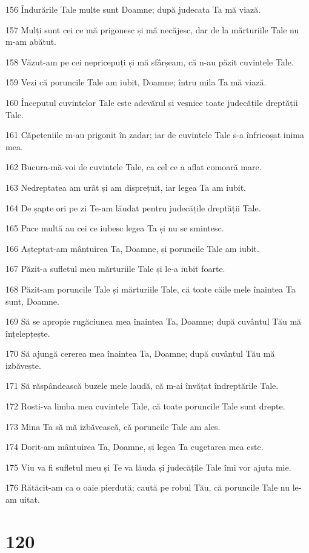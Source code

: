 \par 156 Îndurările Tale multe sunt Doamne; după judecata Ta mă viază.
\par 157 Mulți sunt cei ce mă prigonesc și mă necăjesc, dar de la mărturiile Tale nu m-am abătut.
\par 158 Văzut-am pe cei nepricepuți și mă sfârșeam, că n-au păzit cuvintele Tale.
\par 159 Vezi că poruncile Tale am iubit, Doamne; întru mila Ta mă viază.
\par 160 Începutul cuvintelor Tale este adevărul și veșnice toate judecățile dreptății Tale.
\par 161 Căpeteniile m-au prigonit în zadar; iar de cuvintele Tale s-a înfricoșat inima mea.
\par 162 Bucura-mă-voi de cuvintele Tale, ca cel ce a aflat comoară mare.
\par 163 Nedreptatea am urât și am disprețuit, iar legea Ta am iubit.
\par 164 De șapte ori pe zi Te-am lăudat pentru judecățile dreptății Tale.
\par 165 Pace multă au cei ce iubesc legea Ta și nu se smintesc.
\par 166 Așteptat-am mântuirea Ta, Doamne, și poruncile Tale am iubit.
\par 167 Păzit-a sufletul meu mărturiile Tale și le-a iubit foarte.
\par 168 Păzit-am poruncile Tale și mărturiile Tale, că toate căile mele înaintea Ta sunt, Doamne.
\par 169 Să se apropie rugăciunea mea înaintea Ta, Doamne; după cuvântul Tău mă înțelepțește.
\par 170 Să ajungă cererea mea înaintea Ta, Doamne; după cuvântul Tău mă izbăvește.
\par 171 Să răspândească buzele mele laudă, că m-ai învățat îndreptările Tale.
\par 172 Rosti-va limba mea cuvintele Tale, că toate poruncile Tale sunt drepte.
\par 173 Mina Ta să mă izbăvească, că poruncile Tale am ales.
\par 174 Dorit-am mântuirea Ta, Doamne, și legea Ta cugetarea mea este.
\par 175 Viu va fi sufletul meu și Te va lăuda și judecățile Tale îmi vor ajuta mie.
\par 176 Rătăcit-am ca o oaie pierdută; caută pe robul Tău, că poruncile Tale nu le-am uitat.

\chapter{120}


